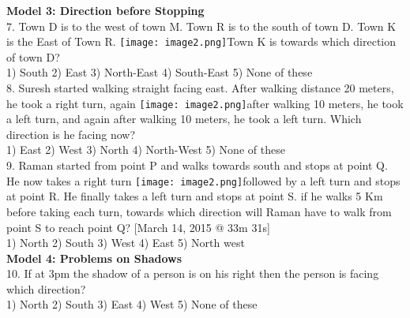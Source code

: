 \documentclass[
]{article}
\begin{document}
\textbf{Model 3: Direction before Stopping}\\
7. Town D is to the west of town M. Town R is to the south of town D. Town K is the East of Town R. \texttt{[image: image2.png]}Town K is towards which direction of town D?\\
1) South \hspace{2mm}2) East \hspace{2mm}3) North-East
\hspace{2mm}4) South-East \hspace{2mm}5) None of these\\

8. Suresh started walking straight facing east. After walking distance 20 meters, he took a right turn, again \texttt{[image: image2.png]}after walking 10 meters, he took a left turn, and again after walking 10 meters, he
took a left turn. Which direction is he facing now?\\
1) East \hspace{2mm}2) West \hspace{2mm}3) North \hspace{2mm}4) North-West \hspace{2mm}5) None of these\\

9. Raman started from point P and walks towards south and stops at point Q. He now takes a right turn \texttt{[image: image2.png]}followed by a left turn and stops at point R. He finally takes a left
turn and stops at point S. if he walks 5 Km before taking each turn, towards which direction will Raman have to walk from point S to reach point Q?
[March 14, 2015 @ 33m 31s]\\
1) North \hspace{2mm}2) South \hspace{2mm}3) West \hspace{2mm}4) East \hspace{2mm}5) North west\\

\textbf{Model 4: Problems on Shadows}\\
10. If at 3pm the shadow of a person is on his right then the person is facing which direction?\\
1) North \hspace{2mm}2) South \hspace{2mm}3) East \hspace{2mm}4) West \hspace{2mm}5) None of these\\
\end{document}

